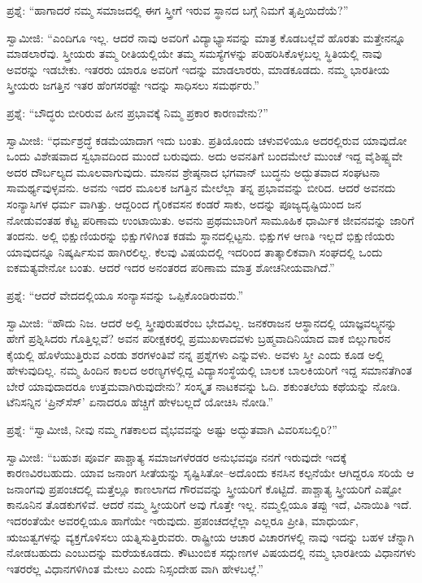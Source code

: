 ಪ್ರಶ್ನೆ: “ಹಾಗಾದರೆ ನಮ್ಮ ಸಮಾಜದಲ್ಲಿ ಈಗ ಸ್ತ್ರೀಗೆ ಇರುವ ಸ್ಥಾನದ ಬಗ್ಗೆ ನಿಮಗೆ ತೃಪ್ತಿಯಿದೆಯೆ?”

ಸ್ವಾಮೀಜಿ: “ಎಂದಿಗೂ ಇಲ್ಲ. ಆದರೆ ನಾವು ಅವರಿಗೆ ವಿದ್ಯಾಭ್ಯಾಸವನ್ನು ಮಾತ್ರ ಕೊಡಬಲ್ಲೆವೆ ಹೊರತು ಮತ್ತೇನನ್ನೂ ಮಾಡಲಾರೆವು. ಸ್ತ್ರೀಯರು ತಮ್ಮ ರೀತಿಯಲ್ಲಿಯೇ ತಮ್ಮ ಸಮಸ್ಯೆಗಳನ್ನು ಪರಿಹರಿಸಿಕೊಳ್ಳಬಲ್ಲ ಸ್ಥಿತಿಯಲ್ಲಿ ನಾವು ಅವರನ್ನು ಇಡಬೇಕು. ಇತರರು ಯಾರೂ ಅವರಿಗೆ ಇದನ್ನು ಮಾಡಲಾರರು, ಮಾಡಕೂಡದು. ನಮ್ಮ ಭಾರತೀಯ ಸ್ತ್ರೀಯರು ಜಗತ್ತಿನ ಇತರ ಹೆಂಗಸರಷ್ಟೇ ಇದನ್ನು ಸಾಧಿಸಲು ಸಮರ್ಥರು.”

ಪ್ರಶ್ನೆ: “ಬೌದ್ಧರು ಬೀರಿರುವ ಹೀನ ಪ್ರಭಾವಕ್ಕೆ ನಿಮ್ಮ ಪ್ರಕಾರ ಕಾರಣವೇನು?”

ಸ್ವಾಮೀಜಿ: “ಧರ್ಮಶ್ರದ್ಧೆ ಕಡಮೆಯಾದಾಗ ಇದು ಬಂತು. ಪ್ರತಿಯೊಂದು ಚಳುವಳಿಯೂ ಅದರಲ್ಲಿರುವ ಯಾವುದೋ ಒಂದು ವಿಶೇಷವಾದ ಸ್ವಭಾವದಿಂದ ಮುಂದೆ ಬರುವುದು. ಅದು ಅವನತಿಗೆ ಬಂದಮೇಲೆ ಮುಂಚೆ ಇದ್ದ ವೈಶಿಷ್ಟ್ಯವೇ ಅದರ ದೌರ್ಬಲ್ಯದ ಮೂಲವಾಗುವುದು. ಮಾನವ ಶ್ರೇಷ್ಠನಾದ ಭಗವಾನ್​ ಬುದ್ಧನು ಅದ್ಭುತವಾದ ಸಂಘಟನಾ ಸಾಮರ್ಥ್ಯವುಳ್ಳವನು. ಅವನು ಇದರ ಮೂಲಕ ಜಗತ್ತಿನ ಮೇಲೆಲ್ಲಾ ತನ್ನ ಪ್ರಭಾವವನ್ನು ಬೀರಿದ. ಆದರೆ ಅವನದು ಸಂನ್ಯಾಸಿಗಳ ಧರ್ಮ ವಾಗಿತ್ತು. ಆದ್ದರಿಂದ ಗೈರಿಕವಸನ ಕಂಡರೆ ಸಾಕು, ಅದನ್ನು ಪೂಜ್ಯದೃಷ್ಟಿಯಿಂದ ಜನ ನೋಡುವಂತಹ ಕೆಟ್ಟ ಪರಿಣಾಮ ಉಂಟಾಯಿತು. ಅವನು ಪ್ರಥಮಬಾರಿಗೆ ಸಾಮೂಹಿಕ ಧಾರ್ಮಿಕ ಜೀವನವನ್ನು ಜಾರಿಗೆ ತಂದನು. ಅಲ್ಲಿ ಭಿಕ್ಷುಣಿಯರನ್ನು ಭಿಕ್ಷುಗಳಿಗಿಂತ ಕಡಮೆ ಸ್ಥಾನದಲ್ಲಿಟ್ಟನು. ಭಿಕ್ಷುಗಳ ಆಣತಿ ಇಲ್ಲದೆ ಭಿಕ್ಷುಣಿಯರು ಯಾವುದನ್ನೂ ನಿಷ್ಕರ್ಷಿಸುವ ಹಾಗಿರಲಿಲ್ಲ. ಕೆಲವು ವಿಷಯದಲ್ಲಿ ಇದರಿಂದ ತಾತ್ಕಾಲಿಕವಾಗಿ ಸಂಘದಲ್ಲಿ ಒಂದು ಐಕಮತ್ಯವೇನೋ ಬಂತು. ಆದರೆ ಇದರ ಅನಂತರದ ಪರಿಣಾಮ ಮಾತ್ರ ಶೋಚನೀಯವಾಗಿದೆ.”

ಪ್ರಶ್ನೆ: “ಆದರೆ ವೇದದಲ್ಲಿಯೂ ಸಂನ್ಯಾಸವನ್ನು ಒಪ್ಪಿಕೊಂಡಿರುವರು.”

ಸ್ವಾಮೀಜಿ: “ಹೌದು ನಿಜ. ಆದರೆ ಅಲ್ಲಿ ಸ್ತ್ರೀಪುರುಷರೆಂಬ ಭೇದವಿಲ್ಲ. ಜನಕರಾಜನ ಆಸ್ಥಾನದಲ್ಲಿ ಯಾಜ್ಞವಲ್ಕ್ಯನನ್ನು ಹೇಗೆ ಪ್ರಶ್ನಿಸಿದರು ಗೊತ್ತಿಲ್ಲವೆ? ಅವನ ಪರೀಕ್ಷಕರಲ್ಲಿ ಪ್ರಮುಖಳಾದವಳು ಬ್ರಹ್ಮವಾದಿನಿಯಾದ ವಾಕ ಬಿಲ್ಲುಗಾರನ ಕೈಯಲ್ಲಿ ಹೊಳೆಯುತ್ತಿರುವ ಎರಡು ಶರಗಳಂತಿವೆ ನನ್ನ ಪ್ರಶ್ನೆಗಳು ಎನ್ನುವಳು. ಅವಳು ಸ್ತ್ರೀ ಎಂದು ಕೂಡ ಅಲ್ಲಿ ಹೇಳುವುದಿಲ್ಲ. ನಮ್ಮ ಹಿಂದಿನ ಕಾಲದ ಅರಣ್ಯಗಳಲ್ಲಿದ್ದ ವಿದ್ಯಾಸಂಸ್ಥೆಯಲ್ಲಿ ಬಾಲಕ ಬಾಲಕಿಯರಿಗೆ ಇದ್ದ ಸಮಾನತೆಗಿಂತ ಬೇರೆ ಯಾವುದಾದರೂ ಉತ್ತಮವಾಗಿರುವುದೇನು? ಸಂಸ್ಕೃತ ನಾಟಕವನ್ನು ಓದಿ. ಶಕುಂತಲೆಯ ಕಥೆಯನ್ನು ನೋಡಿ. ಟೆನಿಸನ್ನಿನ ‘ಪ್ರಿನ್​ಸೆಸ್​’ ಏನಾದರೂ ಹೆಚ್ಚಿಗೆ ಹೇಳಬಲ್ಲದೆ ಯೋಚಿಸಿ ನೋಡಿ.”

ಪ್ರಶ್ನೆ: “ಸ್ವಾಮೀಜಿ, ನೀವು ನಮ್ಮ ಗತಕಾಲದ ವೈಭವವನ್ನು ಅಷ್ಟು ಅದ್ಭುತವಾಗಿ ವಿವರಿಸಬಲ್ಲಿರಿ?”

ಸ್ವಾಮೀಜಿ: “ಬಹುಶಃ ಪೂರ್ವ ಪಾಶ್ಚಾತ್ಯ ಸಮಾಜಗಳೆರಡರ ಅನುಭವವೂ ನನಗೆ ಇರುವುದೇ ಇದಕ್ಕೆ ಕಾರಣವಿರಬಹುದು. ಯಾವ ಜನಾಂಗ ಸೀತೆಯನ್ನು ಸೃಷ್ಟಿಸಿತೋ–ಅದೊಂದು ಕನಸಿನ ಕಲ್ಪನೆಯೇ ಆಗಿದ್ದರೂ ಸರಿಯೆ ಆ ಜನಾಂಗವು ಪ್ರಪಂಚದಲ್ಲಿ ಮತ್ತೆಲ್ಲೂ ಕಾಣಲಾಗದ ಗೌರವವನ್ನು ಸ್ತ್ರೀಯರಿಗೆ ಕೊಟ್ಟಿದೆ. ಪಾಶ್ಚಾತ್ಯ ಸ್ತ್ರೀಯರಿಗೆ ಎಷ್ಟೋ ಕಾನೂನಿನ ತೊಡಕುಗಳಿವೆ. ಆದರೆ ನಮ್ಮ ಸ್ತ್ರೀಯರಿಗೆ ಅವು ಗೊತ್ತೇ ಇಲ್ಲ. ನಮ್ಮಲ್ಲಿಯೂ ತಪ್ಪು ಇದೆ, ವಿನಾಯಿತಿ ಇದೆ. ಇದರಂತೆಯೇ ಅವರಲ್ಲಿಯೂ ಹಾಗೆಯೇ ಇರುವುದು. ಪ್ರಪಂಚದಲ್ಲೆಲ್ಲಾ ಎಲ್ಲರೂ ಪ್ರೀತಿ, ಮಾಧುರ್ಯ, ಋಜುತ್ವಗಳನ್ನು ವ್ಯಕ್ತಗೊಳಿಸಲು ಯತ್ನಿಸುತ್ತಿರುವರು. ರಾಷ್ಟ್ರೀಯ ಆಚಾರ ವಿಚಾರಗಳಲ್ಲಿ ನಾವು ಇದನ್ನು ಬಹಳ ಚೆನ್ನಾಗಿ ನೋಡಬಹುದು ಎಂಬುದನ್ನು ಮರೆಯಕೂಡದು. ಕೌಟುಂಬಿಕ ಸದ್ಗುಣಗಳ ವಿಷಯದಲ್ಲಿ ನಮ್ಮ ಭಾರತೀಯ ವಿಧಾನಗಳು ಇತರರೆಲ್ಲ ವಿಧಾನಗಳಿಗಿಂತ ಮೇಲು ಎಂದು ನಿಸ್ಸಂದೇಹ ವಾಗಿ ಹೇಳಬಲ್ಲೆ.”

